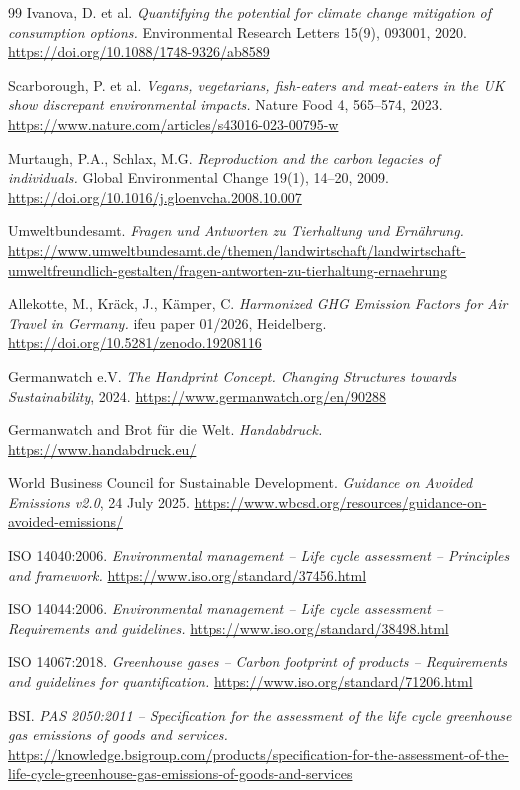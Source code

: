\documentclass[11pt,a4paper]{article}
\begin{document}
\begin{thebibliography}{99}
 Ivanova, D. et al. \emph{Quantifying the potential for climate change mitigation of consumption options.} Environmental Research Letters 15(9), 093001, 2020. \url{https://doi.org/10.1088/1748-9326/ab8589}

 Scarborough, P. et al. \emph{Vegans, vegetarians, fish-eaters and meat-eaters in the UK show discrepant environmental impacts.} Nature Food 4, 565--574, 2023. \url{https://www.nature.com/articles/s43016-023-00795-w}

 Murtaugh, P.A., Schlax, M.G. \emph{Reproduction and the carbon legacies of individuals.} Global Environmental Change 19(1), 14--20, 2009. \url{https://doi.org/10.1016/j.gloenvcha.2008.10.007}

 Umweltbundesamt. \emph{Fragen und Antworten zu Tierhaltung und Ernährung.} \url{https://www.umweltbundesamt.de/themen/landwirtschaft/landwirtschaft-umweltfreundlich-gestalten/fragen-antworten-zu-tierhaltung-ernaehrung}

 Allekotte, M., Kräck, J., Kämper, C. \emph{Harmonized GHG Emission Factors for Air Travel in Germany.} ifeu paper 01/2026, Heidelberg. \url{https://doi.org/10.5281/zenodo.19208116}

 Germanwatch e.V. \emph{The Handprint Concept. Changing Structures towards Sustainability}, 2024. \url{https://www.germanwatch.org/en/90288}

 Germanwatch and Brot für die Welt. \emph{Handabdruck.} \url{https://www.handabdruck.eu/}

 World Business Council for Sustainable Development. \emph{Guidance on Avoided Emissions v2.0}, 24 July 2025. \url{https://www.wbcsd.org/resources/guidance-on-avoided-emissions/}

 ISO 14040:2006. \emph{Environmental management -- Life cycle assessment -- Principles and framework.} \url{https://www.iso.org/standard/37456.html}

 ISO 14044:2006. \emph{Environmental management -- Life cycle assessment -- Requirements and guidelines.} \url{https://www.iso.org/standard/38498.html}

 ISO 14067:2018. \emph{Greenhouse gases -- Carbon footprint of products -- Requirements and guidelines for quantification.} \url{https://www.iso.org/standard/71206.html}

 BSI. \emph{PAS 2050:2011 -- Specification for the assessment of the life cycle greenhouse gas emissions of goods and services.} \url{https://knowledge.bsigroup.com/products/specification-for-the-assessment-of-the-life-cycle-greenhouse-gas-emissions-of-goods-and-services}


\end{thebibliography}
\end{document}
